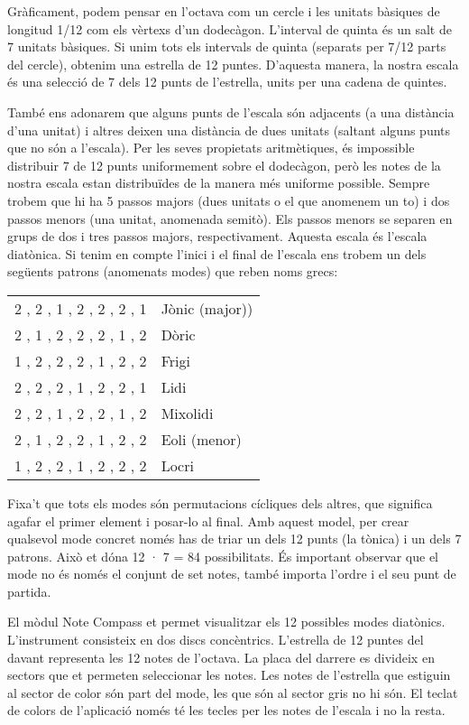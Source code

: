Gràficament, podem pensar en l'octava com un cercle i les unitats bàsiques de longitud 1/12 com els vèrtexs d'un dodecàgon. L'interval de quinta és un salt de 7 unitats bàsiques. Si unim tots els intervals de quinta (separats per 7/12 parts del cercle), obtenim una estrella de 12 puntes. D'aquesta manera, la nostra escala és una selecció de 7 dels 12 punts de l'estrella, units per una cadena de quintes.

També ens adonarem que alguns punts de l'escala són adjacents (a una distància d'una unitat) i altres deixen una distància de dues unitats (saltant alguns punts que no són a l'escala). Per les seves propietats aritmètiques, és impossible distribuir 7 de 12 punts uniformement sobre el dodecàgon, però les notes de la nostra escala estan distribuïdes de la manera més uniforme possible. Sempre trobem que hi ha 5 passos majors (dues unitats o el que anomenem un to) i dos passos menors (una unitat, anomenada semitò). Els passos menors se separen en grups de  dos i tres passos majors, respectivament. Aquesta escala és l'escala diatònica. Si tenim en compte l'inici i el final de l'escala ens trobem un dels següents patrons (anomenats modes) que reben noms grecs:

\begin{center}
\begin{tabular}{rl}
	2 , 2 , 1 , 2 , 2 , 2 , 1 & Jònic (major)) \\
	2 , 1 , 2 , 2 , 2 , 1 , 2 & Dòric \\
	1 , 2 , 2 , 2 , 1 , 2 , 2 & Frigi \\
	2 , 2 , 2 , 1 , 2 , 2 , 1 & Lidi \\
	2 , 2 , 1 , 2 , 2 , 1 , 2 & Mixolidi \\
	2 , 1 , 2 , 2 , 1 , 2 , 2 & Eoli (menor) \\
	1 , 2 , 2 , 1 , 2 , 2 , 2 & Locri \\
\end{tabular}
\end{center}

Fixa't que tots els modes són permutacions cícliques dels altres, que significa agafar el primer element i posar-lo al final. Amb aquest model, per crear qualsevol mode concret només has de triar un dels 12 punts (la tònica) i un dels 7 patrons. Això et dóna  12 · 7 = 84 possibilitats. És important observar que el mode no és només el conjunt de set notes, també importa l'ordre i el seu punt de partida.

El mòdul Note Compass et permet visualitzar els 12 possibles modes diatònics. L'instrument consisteix en dos discs concèntrics. L'estrella de 12 puntes del davant representa les 12 notes de l'octava. La placa del darrere es divideix en sectors que et permeten seleccionar les notes. Les notes de l'estrella que estiguin al sector de color són part del mode, les que són al sector gris no hi són. El teclat de colors de l'aplicació només té les tecles per les notes de l'escala i no la resta.

